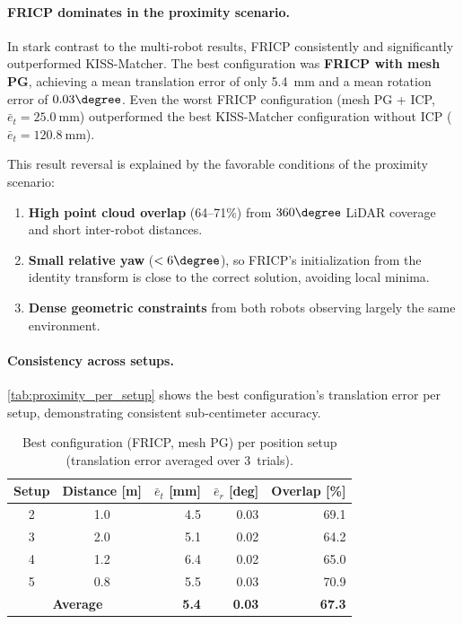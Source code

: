 \paragraph{FRICP dominates in the proximity scenario.}
In stark contrast to the multi-robot results, FRICP consistently
and significantly outperformed KISS-Matcher.
The best configuration was \textbf{FRICP with mesh PG}, achieving
a mean translation error of only \SI{5.4}{\milli\metre} and a mean
rotation error of $0.03\degree$.
Even the worst FRICP configuration (mesh PG + ICP,
$\bar{e}_t = \SI{25.0}{\milli\metre}$) outperformed the best
KISS-Matcher configuration without ICP ($\bar{e}_t =
\SI{120.8}{\milli\metre}$).

This result reversal is explained by the favorable conditions
of the proximity scenario:
\begin{enumerate}
    \item \textbf{High point cloud overlap} (64--71\%) from
          $360\degree$ LiDAR coverage and short inter-robot distances.
    \item \textbf{Small relative yaw} ($< 6\degree$), so FRICP's
          initialization from the identity transform is close
          to the correct solution, avoiding local minima.
    \item \textbf{Dense geometric constraints} from both robots
          observing largely the same environment.
\end{enumerate}

\paragraph{Consistency across setups.}
\autoref{tab:proximity_per_setup} shows the best configuration's
translation error per setup, demonstrating consistent
sub-centimeter accuracy.

\begin{table}[htbp]
    \centering
    \caption{Best configuration (FRICP, mesh PG) per position setup
             (translation error averaged over 3~trials).}
    \label{tab:proximity_per_setup}
    \small
    \begin{tabular}{c c r r r}
        \toprule
        \textbf{Setup}
            & \textbf{Distance} [m]
            & $\bar{e}_t$ [mm]
            & $\bar{e}_r$ [deg]
            & \textbf{Overlap} [\%] \\
        \midrule
        2 & 1.0  &  4.5  & 0.03  & 69.1 \\
        3 & 2.0  &  5.1  & 0.02  & 64.2 \\
        4 & 1.2  &  6.4  & 0.02  & 65.0 \\
        5 & 0.8  &  5.5  & 0.03  & 70.9 \\
        \midrule
        \multicolumn{2}{c}{\textbf{Average}}
            & \textbf{5.4} & \textbf{0.03} & \textbf{67.3} \\
        \bottomrule
    \end{tabular}
\end{table}

